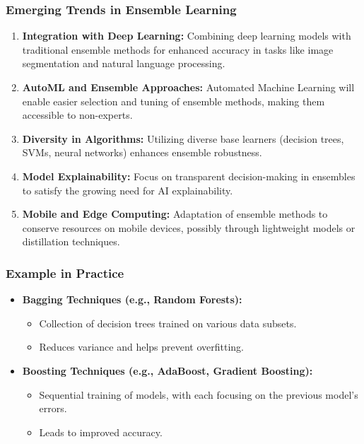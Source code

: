 \documentclass[aspectratio=169]{beamer}
\begin{document}
\begin{frame}[fragile]
    \frametitle{Emerging Trends in Ensemble Learning}
    \begin{enumerate}
        \item \textbf{Integration with Deep Learning:} 
            Combining deep learning models with traditional ensemble methods for enhanced accuracy in tasks like image segmentation and natural language processing.
        \item \textbf{AutoML and Ensemble Approaches:} 
            Automated Machine Learning will enable easier selection and tuning of ensemble methods, making them accessible to non-experts.
        \item \textbf{Diversity in Algorithms:} 
            Utilizing diverse base learners (decision trees, SVMs, neural networks) enhances ensemble robustness.
        \item \textbf{Model Explainability:} 
            Focus on transparent decision-making in ensembles to satisfy the growing need for AI explainability.
        \item \textbf{Mobile and Edge Computing:} 
            Adaptation of ensemble methods to conserve resources on mobile devices, possibly through lightweight models or distillation techniques.
    \end{enumerate}
\end{frame}

\begin{frame}[fragile]
    \frametitle{Example in Practice}
    \begin{itemize}
        \item \textbf{Bagging Techniques (e.g., Random Forests):}
            \begin{itemize}
                \item Collection of decision trees trained on various data subsets.
                \item Reduces variance and helps prevent overfitting.
            \end{itemize}
        \item \textbf{Boosting Techniques (e.g., AdaBoost, Gradient Boosting):}
            \begin{itemize}
                \item Sequential training of models, with each focusing on the previous model's errors.
                \item Leads to improved accuracy.
            \end{itemize}
    \end{itemize}
\end{frame}
\end{document}
